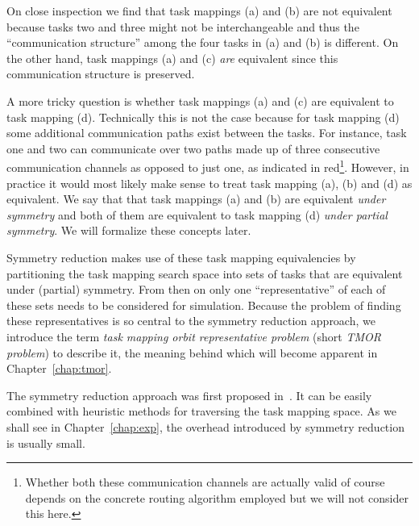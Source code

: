 On close inspection we find that task mappings (a) and (b) are not equivalent
because tasks two and three might not be interchangeable and thus the
``communication structure'' among the four tasks in (a) and (b) is different.
On the other hand, task mappings (a) and (c) \textit{are} equivalent since this
communication structure is preserved.

A more tricky question is whether task mappings (a) and (c) are equivalent to
task mapping (d). Technically this is not the case because for task mapping (d)
some additional communication paths exist between the tasks. For instance, task
one and two can communicate over two paths made up of three consecutive
communication channels as opposed to just one, as indicated in
red\footnote{Whether both these communication channels are actually valid of
course depends on the concrete routing algorithm employed but we will not
consider this here.}.  However, in practice it would most likely make sense to
treat task mapping (a), (b) and (d) as equivalent. We say that that task
mappings (a) and (b) are equivalent \textit{under symmetry} and both of them
are equivalent to task mapping (d) \textit{under partial symmetry}. We will
formalize these concepts later.

Symmetry reduction makes use of these task mapping equivalencies by
partitioning the task mapping search space into sets of tasks that are
equivalent under (partial) symmetry. From then on only one ``representative''
of each of these sets needs to be considered for simulation. Because the
problem of finding these representatives is so central to the symmetry
reduction approach, we introduce the term \textit{task mapping orbit
representative problem} (short \textit{TMOR problem}) to describe it, the
meaning behind which will become apparent in Chapter~\ref{chap:tmor}.

The symmetry reduction approach was first proposed in~\cite{Goens}. It can be
easily combined with heuristic methods for traversing the task mapping space.
As we shall see in Chapter~\ref{chap:exp}, the overhead introduced by symmetry
reduction is usually small.
